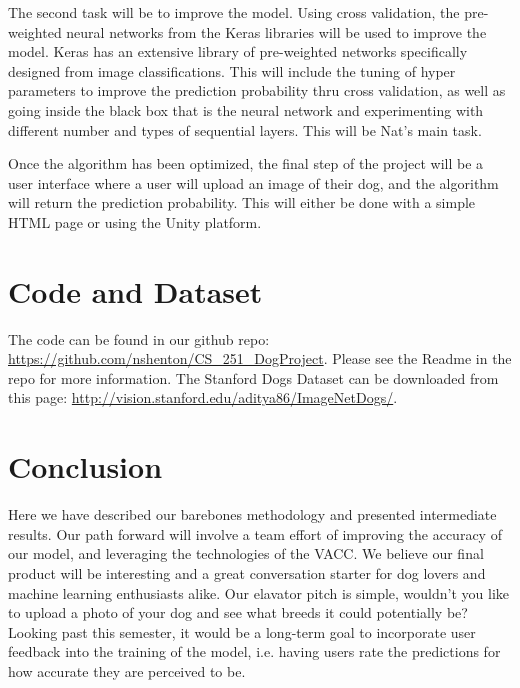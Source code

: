 \documentclass[12pt]{article}
\begin{document}
The second task will be to improve the model.  Using cross validation, the pre-weighted neural networks from the Keras libraries will be used to improve the model. Keras has an extensive library of pre-weighted networks specifically designed from image classifications.   This will include the tuning of hyper parameters to improve the prediction probability thru cross validation, as well as going inside the black box that is the neural network and experimenting with different number and types of sequential layers.  This will be Nat's main task.  

Once the algorithm has been optimized, the final step of the project will be a user interface where a user will upload an image of their dog, and the algorithm will return the prediction probability.  This will either be done with a simple HTML page or using the Unity platform. 



\section{Code and Dataset}

The code can be found in our github repo: \url{https://github.com/nshenton/CS_251_DogProject}.  Please see the Readme in the repo for more information.  The Stanford Dogs Dataset can be downloaded from this page: \url{http://vision.stanford.edu/aditya86/ImageNetDogs/}.

\section{Conclusion}

Here we have described our barebones methodology and presented intermediate results. Our path forward will involve a team effort of improving the accuracy of our model, and leveraging the technologies of the VACC. We believe our final product will be interesting and a great conversation starter for dog lovers and machine learning enthusiasts alike. Our elavator pitch is simple, wouldn't you like to upload a photo of your dog and see what breeds it could potentially be? Looking past this semester, it would be a long-term goal to incorporate user feedback into the training of the model, i.e. having users rate the predictions for how accurate they are perceived to be. 

{}

\end{document}
